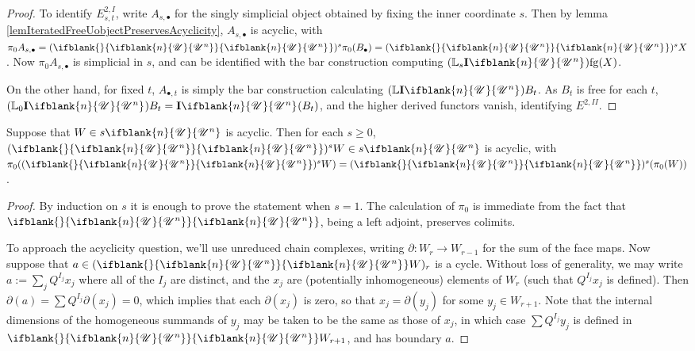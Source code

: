 \documentclass[10pt]{article}
\newcommand{\nontop}[1]{\ifblank{#1}{\scrU}{\scrU^{#1}}}
\newcommand{\Ind}[2][]{\mathbf{I}{#2}_{#1}}%
\newcommand{\forget}{\mathrm{fg}}
\newcommand{\Fr}[2][]{\ifblank{#1}{#2}{#2_{#1}}}
\newcommand{\derived}{\mathbb{L}}
\begin{document}
\begin{GrothendieckSpectralSequences}
\begin{shaded}
\begin{proof}
To identify ${E}^{2,I}_{s,t}$, write $A_{s,\bullet}$ for the singly simplicial object obtained by fixing the inner coordinate $s$. Then by lemma \ref{lemIteratedFreeUobjectPreservesAcyclicity}, $A_{s,\bullet}$ is acyclic, with $\pi_0 A_{s,\bullet}=(\Fr{\nontop{n}})^s\pi_0(B_\bullet)= (\Fr{\nontop{n}})^sX$. Now $\pi_0 A_{s,\bullet}$ is simplicial in $s$, and can be identified with the bar construction computing $(\derived_s{\Ind{\nontop{n}}})\forget(X)$.

On the other hand, for fixed $t$, $A_{\bullet,t}$ is simply the bar construction calculating $(\derived\Ind{\nontop{n}})B_t$. As $B_t$ is free for each $t$, $(\derived_0\Ind{\nontop{n}})B_t=\Ind{\nontop{n}}(B_t)$, and the higher derived functors vanish, identifying $E^{2,II}$.
\end{proof}
\begin{lem}\label{lemIteratedFreeUobjectPreservesAcyclicity}
Suppose that $W\in s\nontop{n}$ is acyclic. Then for each $s\geq0$,  $(\Fr{\nontop{n}})^sW\in s\nontop{n}$ is acyclic, with $\pi_0((\Fr{\nontop{n}})^sW)=(\Fr{\nontop{n}})^s(\pi_0(W))$.
\end{lem}
\begin{proof}
By induction on $s$ it is enough to prove the statement when $s=1$. The calculation of $\pi_0$ is immediate from the fact that $\Fr{\nontop{n}}$, being a left adjoint, preserves colimits.

To approach the acyclicity question, we'll use unreduced chain complexes, writing $\partial:W_r\to W_{r-1}$ for the sum of the face maps. Now suppose that $a\in(\Fr{\nontop{n}}W)_r$ is a cycle. Without loss of generality, we may write
$a:=\sum_j Q^{I_j}x_j$
where all of the $I_j$ are distinct, and the $x_j$ are (potentially inhomogeneous) elements of $W_r$ (such that $Q^{I_j}x_j$ is defined). Then $\partial (a)=\sum Q^{I_j}\partial(x_j)=0$, which implies that each $\partial(x_j)$ is zero, so that $x_j=\partial(y_j)$ for some $y_j\in W_{r+1}$. Note that the internal dimensions of the homogeneous summands of $y_j$ may be taken to be the same as those of $x_j$, in which case $\sum Q^{I_j}y_j$ is defined in $\Fr{\nontop{n}}W_{r+1}$, and has boundary $a$.
\end{proof}
\end{shaded}
\end{GrothendieckSpectralSequences}
\end{document}
